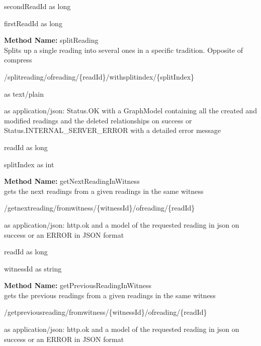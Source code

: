 \begin{parameter}
secondReadId as long
\end{parameter}
\begin{parameter}
firstReadId as long
\end{parameter}
\textbf{Method Name: }splitReading \\ Splits up a single reading into several ones in a specific tradition. Opposite of compress
\begin{post}
/splitreading/ofreading/\{readId\}/withsplitindex/\{splitIndex\}
\end{post}
\begin{request}
 as text/plain
\end{request}
\begin{response}
 as application/json: Status.OK with a GraphModel containing all the created and modified readings and the deleted relationships on success or Status.INTERNAL\_SERVER\_ERROR with a detailed error message
\end{response}
\begin{parameter}
readId as long
\end{parameter}
\begin{parameter}
splitIndex as int
\end{parameter}
\textbf{Method Name: }getNextReadingInWitness \\ gets the next readings from a given readings in the same witness
\begin{get}
/getnextreading/fromwitness/\{witnessId\}/ofreading/\{readId\}
\end{get}
\begin{response}
 as application/json: http.ok and a model of the requested reading in json on success or an ERROR in JSON format
\end{response}
\begin{parameter}
readId as long
\end{parameter}
\begin{parameter}
witnessId as string
\end{parameter}
\textbf{Method Name: }getPreviousReadingInWitness \\ gets the previous readings from a given readings in the same witness
\begin{get}
/getpreviousreading/fromwitness/\{witnessId\}/ofreading/\{readId\}
\end{get}
\begin{response}
 as application/json: http.ok and a model of the requested reading in json on success or an ERROR in JSON format
\end{response}
